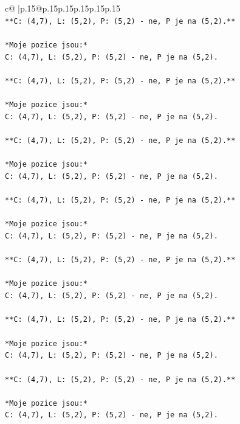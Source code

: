 \documentclass{article}
\begin{document}
{\begin{supertabular}{c@{$\;$}|p{.15\linewidth}@{}p{.15\linewidth}p{.15\linewidth}p{.15\linewidth}p{.15\linewidth}p{.15\linewidth}}
{{{\\ 
\texttt{**C: (4,7), L: (5,2), P: (5,2) {-} ne, P je na (5,2).**} \\
\\ 
\texttt{*Moje pozice jsou:*} \\
\texttt{C: (4,7), L: (5,2), P: (5,2) {-} ne, P je na (5,2).} \\
\\ 
\texttt{**C: (4,7), L: (5,2), P: (5,2) {-} ne, P je na (5,2).**} \\
\\ 
\texttt{*Moje pozice jsou:*} \\
\texttt{C: (4,7), L: (5,2), P: (5,2) {-} ne, P je na (5,2).} \\
\\ 
\texttt{**C: (4,7), L: (5,2), P: (5,2) {-} ne, P je na (5,2).**} \\
\\ 
\texttt{*Moje pozice jsou:*} \\
\texttt{C: (4,7), L: (5,2), P: (5,2) {-} ne, P je na (5,2).} \\
\\ 
\texttt{**C: (4,7), L: (5,2), P: (5,2) {-} ne, P je na (5,2).**} \\
\\ 
\texttt{*Moje pozice jsou:*} \\
\texttt{C: (4,7), L: (5,2), P: (5,2) {-} ne, P je na (5,2).} \\
\\ 
\texttt{**C: (4,7), L: (5,2), P: (5,2) {-} ne, P je na (5,2).**} \\
\\ 
\texttt{*Moje pozice jsou:*} \\
\texttt{C: (4,7), L: (5,2), P: (5,2) {-} ne, P je na (5,2).} \\
\\ 
\texttt{**C: (4,7), L: (5,2), P: (5,2) {-} ne, P je na (5,2).**} \\
\\ 
\texttt{*Moje pozice jsou:*} \\
\texttt{C: (4,7), L: (5,2), P: (5,2) {-} ne, P je na (5,2).} \\
\\ 
\texttt{**C: (4,7), L: (5,2), P: (5,2) {-} ne, P je na (5,2).**} \\
\\ 
\texttt{*Moje pozice jsou:*} \\
\texttt{C: (4,7), L: (5,2), P: (5,2) {-} ne, P je na (5,2).} \\
}}}
\end{supertabular}}
\end{document}
